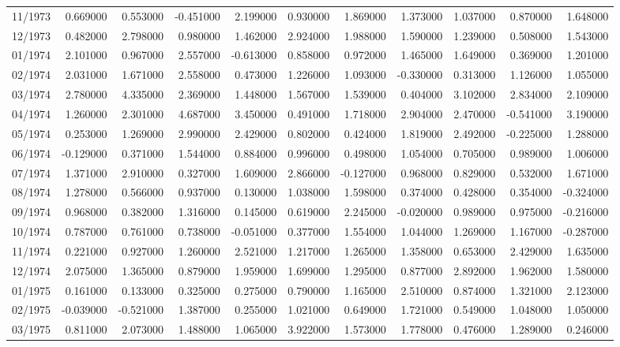 \begin{tabular}{lrrrrrrrrrr}
11/1973 & 0.669000 & 0.553000 & -0.451000 & 2.199000 & 0.930000 & 1.869000 & 1.373000 & 1.037000 & 0.870000 & 1.648000 \\
12/1973 & 0.482000 & 2.798000 & 0.980000 & 1.462000 & 2.924000 & 1.988000 & 1.590000 & 1.239000 & 0.508000 & 1.543000 \\
01/1974 & 2.101000 & 0.967000 & 2.557000 & -0.613000 & 0.858000 & 0.972000 & 1.465000 & 1.649000 & 0.369000 & 1.201000 \\
02/1974 & 2.031000 & 1.671000 & 2.558000 & 0.473000 & 1.226000 & 1.093000 & -0.330000 & 0.313000 & 1.126000 & 1.055000 \\
03/1974 & 2.780000 & 4.335000 & 2.369000 & 1.448000 & 1.567000 & 1.539000 & 0.404000 & 3.102000 & 2.834000 & 2.109000 \\
04/1974 & 1.260000 & 2.301000 & 4.687000 & 3.450000 & 0.491000 & 1.718000 & 2.904000 & 2.470000 & -0.541000 & 3.190000 \\
05/1974 & 0.253000 & 1.269000 & 2.990000 & 2.429000 & 0.802000 & 0.424000 & 1.819000 & 2.492000 & -0.225000 & 1.288000 \\
06/1974 & -0.129000 & 0.371000 & 1.544000 & 0.884000 & 0.996000 & 0.498000 & 1.054000 & 0.705000 & 0.989000 & 1.006000 \\
07/1974 & 1.371000 & 2.910000 & 0.327000 & 1.609000 & 2.866000 & -0.127000 & 0.968000 & 0.829000 & 0.532000 & 1.671000 \\
08/1974 & 1.278000 & 0.566000 & 0.937000 & 0.130000 & 1.038000 & 1.598000 & 0.374000 & 0.428000 & 0.354000 & -0.324000 \\
09/1974 & 0.968000 & 0.382000 & 1.316000 & 0.145000 & 0.619000 & 2.245000 & -0.020000 & 0.989000 & 0.975000 & -0.216000 \\
10/1974 & 0.787000 & 0.761000 & 0.738000 & -0.051000 & 0.377000 & 1.554000 & 1.044000 & 1.269000 & 1.167000 & -0.287000 \\
11/1974 & 0.221000 & 0.927000 & 1.260000 & 2.521000 & 1.217000 & 1.265000 & 1.358000 & 0.653000 & 2.429000 & 1.635000 \\
12/1974 & 2.075000 & 1.365000 & 0.879000 & 1.959000 & 1.699000 & 1.295000 & 0.877000 & 2.892000 & 1.962000 & 1.580000 \\
01/1975 & 0.161000 & 0.133000 & 0.325000 & 0.275000 & 0.790000 & 1.165000 & 2.510000 & 0.874000 & 1.321000 & 2.123000 \\
02/1975 & -0.039000 & -0.521000 & 1.387000 & 0.255000 & 1.021000 & 0.649000 & 1.721000 & 0.549000 & 1.048000 & 1.050000 \\
03/1975 & 0.811000 & 2.073000 & 1.488000 & 1.065000 & 3.922000 & 1.573000 & 1.778000 & 0.476000 & 1.289000 & 0.246000 \\

\end{tabular}
